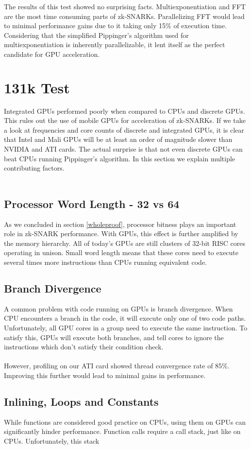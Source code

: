 The results of this test showed no surprising facts. Multiexponentiation and FFT are the most time consuming parts of zk-SNARKs. Parallelizing FFT would lead to minimal performance gains due to it taking only 15\% of execution time. Considering that the simplified Pippinger's algorithm used for multiexponentiation is inherently parallelizable, it lent itself as the perfect candidate for GPU acceleration.

\section{131k Test}

Integrated GPUs performed poorly when compared to CPUs and discrete GPUs. This rules out the use of mobile GPUs for acceleration of zk-SNARKs. If we take a look at frequencies and core counts of discrete and integrated GPUs, it is clear that Intel and Mali GPUs will be at least an order of magnitude slower than NVIDIA and ATI cards. The actual surprise is that not even discrete GPUs can beat CPUs running Pippinger's algorithm. In this section we explain multiple contributing factors.\\
\\
\subsection{Processor Word Length - 32 vs 64}

As we concluded in section \ref{wholeproof}, processor bitness plays an important role in zk-SNARK performance. With GPUs, this effect is further amplified by the memory hierarchy. All of today's GPUs are still clusters of 32-bit RISC cores operating in unison. Small word length means that these cores need to execute several times more instructions than CPUs running equivalent code.\\

\subsection{Branch Divergence}

A common problem with code running on GPUs is branch divergence. When CPU encounters a branch in the code, it will execute only one of two code paths. Unfortunately, all GPU cores in a group need to execute the same instruction. To satisfy this, GPUs will execute both branches, and tell cores to ignore the instructions which don't satisfy their condition check.\\
\\
However, profiling on our ATI card showed thread convergence rate of 85\%. Improving this further would lead to minimal gains in performance.

\subsection{Inlining, Loops and Constants}

While functions are considered good practice on CPUs, using them on GPUs can significantly hinder performance. Function calls require a call stack, just like on CPUs. Unfortunately, this stack